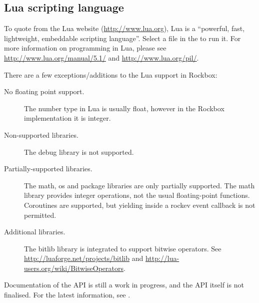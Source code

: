 \subsection{Lua scripting language}

To quote from the Lua website (\url{http://www.lua.org}), Lua is a ``powerful,
fast, lightweight, embeddable scripting language''. Select a  file
in the  to run it. For more information on programming
in Lua, please see \url{http://www.lua.org/manual/5.1/} and
\url{http://www.lua.org/pil/}.

There are a few exceptions/additions to the Lua support in Rockbox:
\begin{description}
    \item[No floating point support.] The number type in Lua is usually float,
    however in the Rockbox implementation it is integer.
    \item[Non-supported libraries.] The debug library is not supported.
    \item[Partially-supported libraries.] The math, os and package libraries
    are only partially supported. The math library provides integer operations,
    not the usual floating-point functions. Coroutines are supported, but
    yielding inside a rockev event callback is not permitted.
    \item[Additional libraries.] The bitlib library is integrated to support
    bitwise operators.  See \url{http://luaforge.net/projects/bitlib} and
    \url{http://lua-users.org/wiki/BitwiseOperators}.
\end{description}

Documentation of the API is still a work in progress, and the API itself is
not finalised. For the latest information, see .\\

